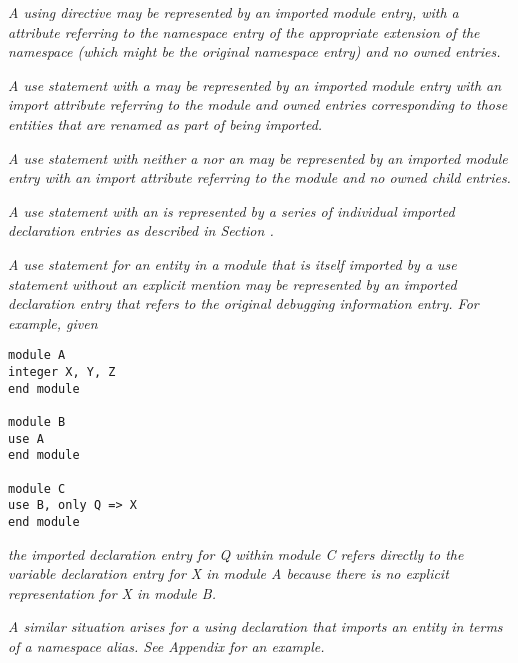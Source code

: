 \textit{A  using directive
may be represented by an imported 
module\hypertarget{chap:DWATimportnamespaceusingdirective}{}
entry, with a \DWATimportDEFN{} attribute referring to the namespace
entry of the appropriate extension of the namespace (which
might be the original namespace entry) and no owned entries.
}

\textit{A  use statement 
with a  may be
represented by an imported module entry with an import
attribute referring to the module and owned entries
corresponding to those entities that are renamed as part of
being imported.
}

\textit{A  use statement
with neither a  nor
an  may be represented by an imported module
entry with an import attribute referring to the module and
no owned child entries.
}

\textit{A use statement with an  is represented by a
series of individual imported declaration entries as described
in Section .
}

\textit{A  use statement for an entity in a module that is
itself imported by a use statement without an explicit mention
may be represented by an imported declaration entry that refers
to the original debugging information entry. For example, given
}
\vspace{2mm}
\begin{lstlisting}
module A
integer X, Y, Z
end module

module B
use A
end module

module C
use B, only Q => X
end module

\end{lstlisting}
\textit{the imported declaration entry for Q within module C refers
directly to the variable declaration entry for X in module A
because there is no explicit representation for X in module B.
}

\textit{A similar situation arises for a  using declaration
that imports an entity in terms of a namespace alias. See 
Appendix  
for an example.
}

